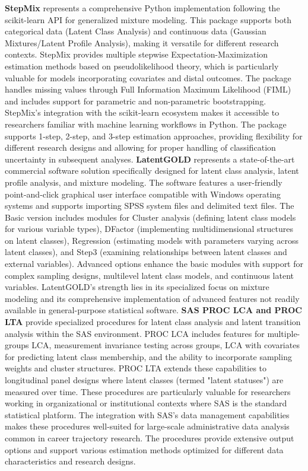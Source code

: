 \documentclass[main.tex]{subfiles}
\begin{document}
\textbf{StepMix} represents a comprehensive Python implementation following the scikit-learn API for generalized mixture modeling\parencite{stepmix2022}. This package supports both categorical data (Latent Class Analysis) and continuous data (Gaussian Mixtures/Latent Profile Analysis), making it versatile for different research contexts. StepMix provides multiple stepwise Expectation-Maximization estimation methods based on pseudolikelihood theory, which is particularly valuable for models incorporating covariates and distal outcomes. The package handles missing values through Full Information Maximum Likelihood (FIML) and includes support for parametric and non-parametric bootstrapping. StepMix's integration with the scikit-learn ecosystem makes it accessible to researchers familiar with machine learning workflows in Python. The package supports 1-step, 2-step, and 3-step estimation approaches, providing flexibility for different research designs and allowing for proper handling of classification uncertainty in subsequent analyses.
\textbf{LatentGOLD} represents a state-of-the-art commercial software solution specifically designed for latent class analysis, latent profile analysis, and mixture modeling\parencite{latentgold2025}. The software features a user-friendly point-and-click graphical user interface compatible with Windows operating systems and supports importing SPSS system files and delimited text files. The Basic version includes modules for Cluster analysis (defining latent class models for various variable types), DFactor (implementing multidimensional structures on latent classes), Regression (estimating models with parameters varying across latent classes), and Step3 (examining relationships between latent classes and external variables). Advanced options enhance the basic modules with support for complex sampling designs, multilevel latent class models, and continuous latent variables. LatentGOLD's strength lies in its specialized focus on mixture modeling and its comprehensive implementation of advanced features not readily available in general-purpose statistical software.
\textbf{SAS PROC LCA and PROC LTA} provide specialized procedures for latent class analysis and latent transition analysis within the SAS environment\parencite{proclca2021}. PROC LCA includes features for multiple-groups LCA, measurement invariance testing across groups, LCA with covariates for predicting latent class membership, and the ability to incorporate sampling weights and cluster structures. PROC LTA extends these capabilities to longitudinal panel designs where latent classes (termed "latent statuses") are measured over time. These procedures are particularly valuable for researchers working in organizational or institutional contexts where SAS is the standard statistical platform. The integration with SAS's data management capabilities makes these procedures well-suited for large-scale administrative data analysis common in career trajectory research. The procedures provide extensive output options and support various estimation methods optimized for different data characteristics and research designs.
\end{document}
